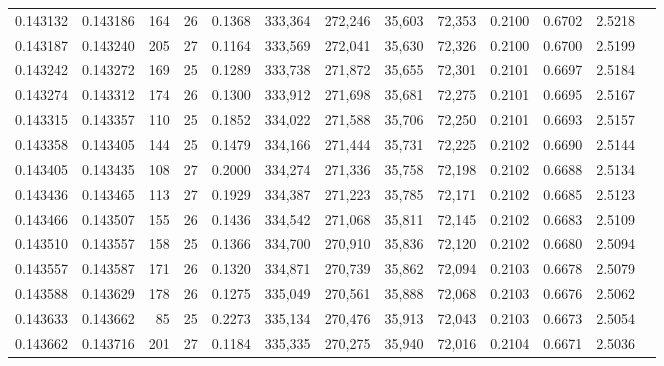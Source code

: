 \begin{tabular}{rrrrrrrrrrrrr}
0.143132 & 0.143186 & 164 &  26 &                                     0.1368 & 333,364 & 272,246 &  35,603 &  72,353 & 0.2100 & 0.6702 & 2.5218 \\
0.143187 & 0.143240 & 205 &  27 &                                     0.1164 & 333,569 & 272,041 &  35,630 &  72,326 & 0.2100 & 0.6700 & 2.5199 \\
0.143242 & 0.143272 & 169 &  25 &                                     0.1289 & 333,738 & 271,872 &  35,655 &  72,301 & 0.2101 & 0.6697 & 2.5184 \\
0.143274 & 0.143312 & 174 &  26 &                                     0.1300 & 333,912 & 271,698 &  35,681 &  72,275 & 0.2101 & 0.6695 & 2.5167 \\
0.143315 & 0.143357 & 110 &  25 &                                     0.1852 & 334,022 & 271,588 &  35,706 &  72,250 & 0.2101 & 0.6693 & 2.5157 \\
0.143358 & 0.143405 & 144 &  25 &                                     0.1479 & 334,166 & 271,444 &  35,731 &  72,225 & 0.2102 & 0.6690 & 2.5144 \\
0.143405 & 0.143435 & 108 &  27 &                                     0.2000 & 334,274 & 271,336 &  35,758 &  72,198 & 0.2102 & 0.6688 & 2.5134 \\
0.143436 & 0.143465 & 113 &  27 &                                     0.1929 & 334,387 & 271,223 &  35,785 &  72,171 & 0.2102 & 0.6685 & 2.5123 \\
0.143466 & 0.143507 & 155 &  26 &                                     0.1436 & 334,542 & 271,068 &  35,811 &  72,145 & 0.2102 & 0.6683 & 2.5109 \\
0.143510 & 0.143557 & 158 &  25 &                                     0.1366 & 334,700 & 270,910 &  35,836 &  72,120 & 0.2102 & 0.6680 & 2.5094 \\
0.143557 & 0.143587 & 171 &  26 &                                     0.1320 & 334,871 & 270,739 &  35,862 &  72,094 & 0.2103 & 0.6678 & 2.5079 \\
0.143588 & 0.143629 & 178 &  26 &                                     0.1275 & 335,049 & 270,561 &  35,888 &  72,068 & 0.2103 & 0.6676 & 2.5062 \\
0.143633 & 0.143662 &  85 &  25 &                                     0.2273 & 335,134 & 270,476 &  35,913 &  72,043 & 0.2103 & 0.6673 & 2.5054 \\
0.143662 & 0.143716 & 201 &  27 &                                     0.1184 & 335,335 & 270,275 &  35,940 &  72,016 & 0.2104 & 0.6671 & 2.5036 \\

\end{tabular}
